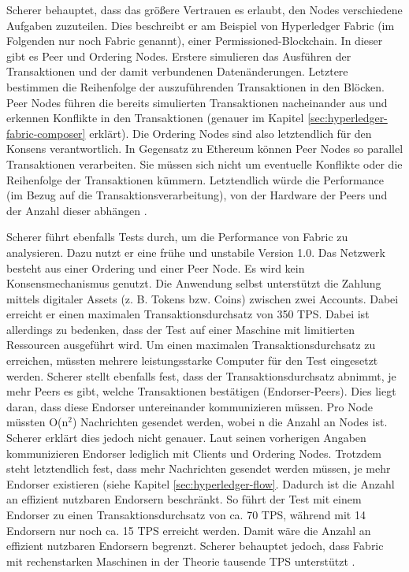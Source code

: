 Scherer behauptet, dass das größere Vertrauen es erlaubt, den Nodes verschiedene Aufgaben zuzuteilen. Dies beschreibt er am Beispiel von Hyperledger Fabric (im Folgenden nur noch Fabric genannt), einer Permissioned-Blockchain. In dieser gibt es Peer und Ordering Nodes. Erstere simulieren das Ausführen der Transaktionen und der damit verbundenen Datenänderungen. Letztere bestimmen die Reihenfolge der auszuführenden Transaktionen in den Blöcken. Peer Nodes führen die bereits simulierten Transaktionen nacheinander aus und erkennen Konflikte in den Transaktionen (genauer im Kapitel \ref{sec:hyperledger-fabric-composer} erklärt). Die Ordering Nodes sind also letztendlich für den Konsens verantwortlich. In Gegensatz zu Ethereum können Peer Nodes so parallel Transaktionen verarbeiten. Sie müssen sich nicht um eventuelle Konflikte oder die Reihenfolge der Transaktionen kümmern. Letztendlich würde die Performance (im Bezug auf die Transaktionsverarbeitung), von der Hardware der Peers und der Anzahl dieser abhängen \cite{SchererPerformanceScalabilityBlockchain2017}.

Scherer führt ebenfalls Tests durch, um die Performance von Fabric zu analysieren. Dazu nutzt er eine frühe und unstabile Version 1.0. Das Netzwerk besteht aus einer Ordering und einer Peer Node. Es wird kein Konsensmechanismus genutzt. Die Anwendung selbst unterstützt die Zahlung mittels digitaler Assets (z. B. Tokens bzw. Coins) zwischen zwei Accounts. Dabei erreicht er einen maximalen Transaktionsdurchsatz von 350 \acs{TPS}. Dabei ist allerdings zu bedenken, dass der Test auf einer Maschine mit limitierten Ressourcen ausgeführt wird. Um einen maximalen Transaktionsdurchsatz zu erreichen, müssten mehrere leistungsstarke Computer für den Test eingesetzt werden. Scherer stellt ebenfalls fest, dass der Transaktionsdurchsatz abnimmt, je mehr Peers es gibt, welche Transaktionen bestätigen (Endorser-Peers). Dies liegt daran, dass diese Endorser untereinander kommunizieren müssen. Pro Node müssten O(n$^2$) Nachrichten gesendet werden, wobei n die Anzahl an Nodes ist. Scherer erklärt dies jedoch nicht genauer. Laut seinen vorherigen Angaben kommunizieren Endorser lediglich mit Clients und Ordering Nodes. Trotzdem steht letztendlich fest, dass mehr Nachrichten gesendet werden müssen, je mehr Endorser existieren (siehe Kapitel \ref{sec:hyperledger-flow}. Dadurch ist die Anzahl an effizient nutzbaren Endorsern beschränkt. So führt der Test mit einem Endorser zu einen Transaktionsdurchsatz von ca. 70 \acs{TPS}, während mit 14 Endorsern nur noch ca. 15 \acs{TPS} erreicht werden. Damit wäre die Anzahl an effizient nutzbaren Endorsern begrenzt. Scherer behauptet jedoch, dass Fabric mit rechenstarken Maschinen in der Theorie tausende \acs{TPS} unterstützt \cite{SchererPerformanceScalabilityBlockchain2017}.

